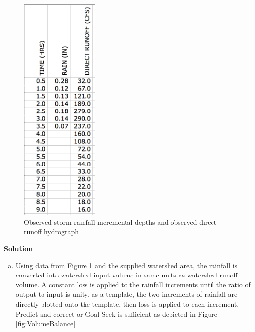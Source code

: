 \documentclass[12pt]{article}
\begin{document}
\begin{enumerate}
\begin{figure}[h!] %
   \centering
   \includegraphics[width=1.5in]{RainRunoff1.jpg} 
   \caption{Observed storm rainfall incremental depths and observed direct runoff hydrograph}
   \label{fig:RainRunoff1}
\end{figure}

\clearpage

\textbf{Solution}

\begin{enumerate}[a)]

\item Using data from Figure \ref{fig:RainRunoff1} and the supplied watershed area, the rainfall is converted into watershed input volume in same units as watershed runoff volume.  A constant loss is applied to the rainfall increments until the ratio of output to input is unity.  as a template, the two increments of rainfall are directly plotted onto the template, then loss is applied to each increment.  Predict-and-correct or Goal Seek is sufficient as depicted in Figure \ref{fig:VolumeBalance}


\end{enumerate}
\end{enumerate}
\end{document}
